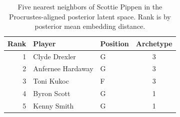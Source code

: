 \begin{table}[htbp]
  \centering\small
  \begin{tabular}{rllc}
    \toprule
    Rank & Player & Position & Archetype \\
    \midrule
    1 & Clyde Drexler & G & 3 \\
    2 & Anfernee Hardaway & G & 3 \\
    3 & Toni Kukoc & F & 3 \\
    4 & Byron Scott & G & 1 \\
    5 & Kenny Smith & G & 1 \\
    \bottomrule
  \end{tabular}
  \caption{Five nearest neighbors of Scottie Pippen in the Procrustes-aligned posterior latent space. Rank is by posterior mean embedding distance.}
  \label{tab:Scottie_Pippen_neighbors}
\end{table}

